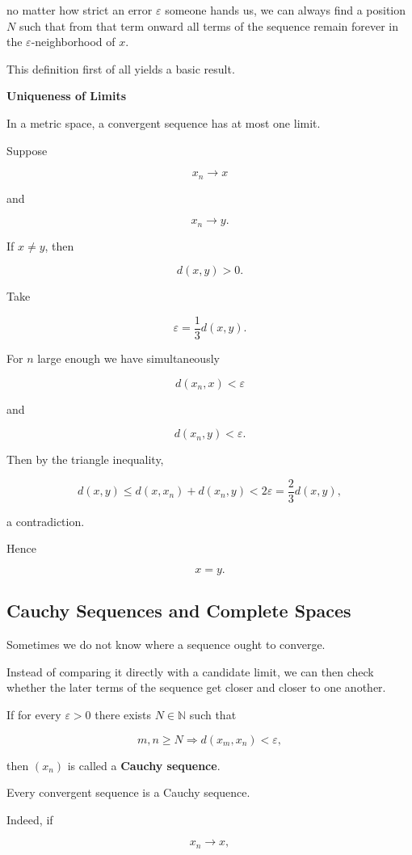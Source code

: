 \documentclass[11pt]{article}
\begin{document}
no matter how strict an error $\varepsilon$ someone hands us, we can always find a position $N$ such that from that term onward all terms of the sequence remain forever in the $\varepsilon$-neighborhood of $x$.

This definition first of all yields a basic result.

\textbf{Uniqueness of Limits}

In a metric space, a convergent sequence has at most one limit.

Suppose

\[
x_{n}\rightarrow x
\]

and

\[
x_{n}\rightarrow y.
\]

If $x\ne y$, then

\[
d(x,y)>0.
\]

Take

\[
\varepsilon=\frac{1}{3}d(x,y).
\]

For $n$ large enough we have simultaneously

\[
d(x_{n},x)<\varepsilon
\]

and

\[
d(x_{n},y)<\varepsilon.
\]

Then by the triangle inequality,

\[
d(x,y)\leq d(x,x_{n})+d(x_{n},y)<2\varepsilon=\frac{2}{3}d(x,y),
\]

a contradiction.

Hence

\[
x=y.
\]

\subsection{Cauchy Sequences and Complete Spaces}

Sometimes we do not know where a sequence ought to converge.

Instead of comparing it directly with a candidate limit, we can then check whether the later terms of the sequence get closer and closer to one another.

If for every $\varepsilon>0$ there exists $N\in\mathbb{N}$ such that

\[
m,n\geq N\Longrightarrow d(x_{m},x_{n})<\varepsilon,
\]

then $(x_{n})$ is called a \textbf{Cauchy sequence}.

Every convergent sequence is a Cauchy sequence.

Indeed, if

\[
x_{n}\rightarrow x,
\]
\end{document}
